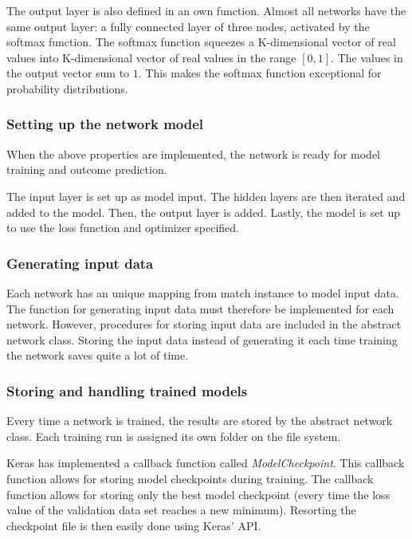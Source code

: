 The output layer is also defined in an own function. Almost all networks have the same output layer: a fully connected layer of three nodes, activated by the softmax function. The softmax function squeezes a K-dimensional vector of real values into K-dimensional vector of real values in the range $[0, 1]$. The values in the output vector sum to $1$. This makes the softmax function exceptional for probability distributions.

\subsubsection{Setting up the network model}

When the above properties are implemented, the network is ready for model training and outcome prediction.

The input layer is set up as model input. The hidden layers are then iterated and added to the model. Then, the output layer is added. Lastly, the model is set up to use the loss function and optimizer specified.

\subsubsection{Generating input data}

Each network has an unique mapping from match instance to model input data. The function for generating input data must therefore be implemented for each network. However, procedures for storing input data are included in the abstract network class. Storing the input data instead of generating it each time training the network saves quite a lot of time.


\subsubsection{Storing and handling trained models}

Every time a network is trained, the results are stored by the abstract network class. Each training run is assigned its own folder on the file system.

Keras has implemented a callback function called \textit{ModelCheckpoint}. This callback function allows for storing model checkpoints during training. The callback function allows for storing only the best model checkpoint (every time the loss value of the validation data set reaches a new minimum). Resorting the checkpoint file is then easily done using Keras' API.

